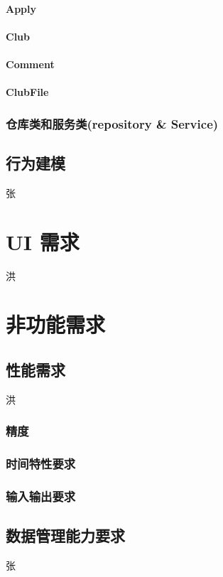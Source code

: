 \documentclass[UTF8]{ctexart}
\begin{document}
\begin{tabular}{|c|c|c|c|c|c|}
\hline
\end{tabular}

\paragraph{Apply}
\paragraph{Club}
\paragraph{Comment}
\paragraph{ClubFile}
\subsubsection{仓库类和服务类(repository \& Service)}
\subsection{行为建模}
张

\section{UI 需求}
洪

\section{非功能需求}
\subsection{性能需求}
洪
\subsubsection{精度}

\subsubsection{时间特性要求}

\subsubsection{输入输出要求}

\subsection{数据管理能力要求}
张
\end{document}
